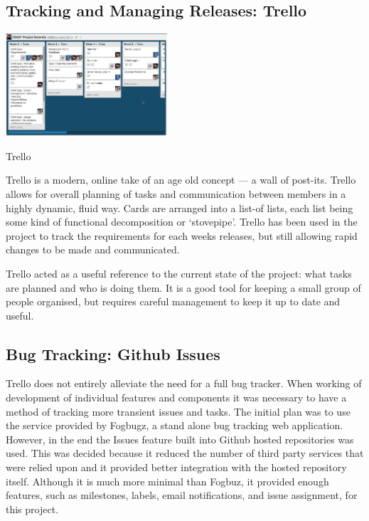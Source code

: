 \subsection{Tracking and Managing Releases: Trello}

\begin{marginfigure}
	\includegraphics[width=6cm]{res/trello.png}
	\caption{Trello}
	\label{fig:trello}
\end{marginfigure}

Trello is a modern, online take of an age old concept --- a wall of post-its. Trello allows for overall planning of tasks and communication between members in a highly dynamic, fluid way. Cards are arranged into a list-of lists, each list being some kind of functional decomposition or `stovepipe'. Trello has been used in the project to track the requirements for each weeks releases, but still allowing rapid changes to be made and communicated.

Trello acted as a useful reference to the current state of the project: what tasks are planned and who is doing them.
It is a good tool for keeping a small group of people organised, but requires careful management to keep it
up to date and useful.

\subsection{Bug Tracking: Github Issues}

Trello does not entirely alleviate the need for a full bug tracker. When working of development of
individual features and components it was necessary to have a method of tracking more transient issues
and tasks. The initial plan was to use the service provided by Fogbugz, a stand alone bug tracking
web application. However, in the end the Issues feature built into Github hosted repositories was
used. This was decided because it reduced the number of third party services that were relied upon
and it provided better integration with the hosted repository itself. Although it is much more minimal
than Fogbuz, it provided enough features, such as milestones, labels, email notifications, and
issue assignment, for this project.

